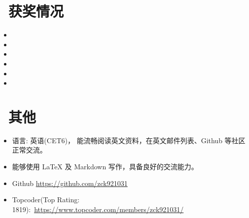 \documentclass{resume}
\begin{document}
\section{\faHeartO\ 获奖情况}

\begin{itemize}[parsep=0.5ex]
\item {}
\item {}
\item {}
\item {}
\item {}
\item {}
\end{itemize}

\section{\faInfo\ 其他}
\begin{itemize}[parsep=0.5ex]
  \item 语言: 英语(CET6)， 能流畅阅读英文资料，在英文邮件列表、Github 等社区正常交流。
  \item 能够使用 LaTeX 及 Markdown 写作，具备良好的交流能力。
  \item \faGithub Github \href{https://github.com/zck921031}{https://github.com/zck921031}
  \item Topcoder(Top Rating: 1819):\  \href{https://www.topcoder.com/members/zck921031/}{https://www.topcoder.com/members/zck921031/}
\end{itemize}

%
%
\end{document}
